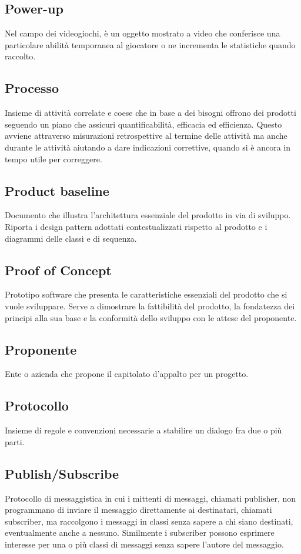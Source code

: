 \subsection{Power-up} Nel campo dei videogiochi, è un oggetto mostrato a video che conferisce una particolare abilità temporanea al giocatore o ne incrementa le statistiche quando raccolto.
\subsection{Processo} Insieme di attività correlate e coese che in base a dei bisogni offrono dei prodotti seguendo un piano che assicuri quantificabilità, efficacia ed efficienza. Questo avviene attraverso misurazioni retrospettive al termine delle attività ma anche durante le attività aiutando a dare indicazioni correttive, quando si è ancora in tempo utile per correggere.
\subsection{Product baseline} Documento che illustra l'architettura essenziale del prodotto in via di sviluppo. \\
Riporta i design pattern adottati contestualizzati rispetto al prodotto e i diagrammi delle classi e di sequenza.
\subsection{Proof of Concept} Prototipo software che presenta le caratteristiche essenziali del prodotto che si vuole sviluppare. Serve a dimostrare la fattibilità del prodotto, la fondatezza dei principi alla sua base e la conformità dello sviluppo con le attese del proponente.
\subsection{Proponente} Ente o azienda che propone il capitolato d’appalto per un progetto.
\subsection{Protocollo} Insieme di regole e convenzioni necessarie a stabilire un dialogo fra due o più parti.
\subsection{Publish/Subscribe} Protocollo di messaggistica in cui i mittenti di messaggi, chiamati publisher, non programmano di inviare il messaggio direttamente ai destinatari, chiamati subscriber, ma raccolgono i messaggi in classi senza sapere a chi siano destinati, eventualmente anche a nessuno. Similmente i subscriber possono esprimere interesse per una o più classi di messaggi senza sapere l'autore del messaggio.
